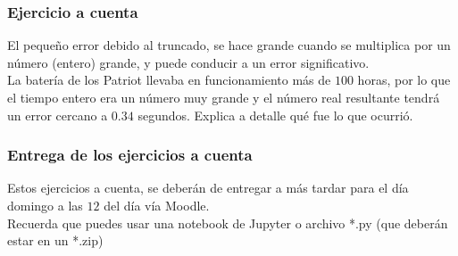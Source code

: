 \documentclass[12pt]{beamer}
\begin{document}
\begin{frame}
\frametitle{Ejercicio a cuenta}
El pequeño error debido al truncado, se hace grande cuando se multiplica por un número (entero) grande, y puede conducir a un error significativo.
\\
\bigskip
La batería de los Patriot llevaba en funcionamiento más de $100$ horas, por lo que el tiempo entero era un número muy grande y el número real resultante tendrá un error cercano a $0.34$ segundos. \pause Explica a detalle qué fue lo que ocurrió.
\end{frame}
\begin{frame}
\frametitle{Entrega de los ejercicios a cuenta}
Estos ejercicios a cuenta, se deberán de entregar a más tardar para el día domingo a las $12$ del día vía Moodle.
\\
\bigskip
Recuerda que puedes usar una notebook de Jupyter o archivo *.py (que deberán estar en un *.zip)
\end{frame}
\end{document}
